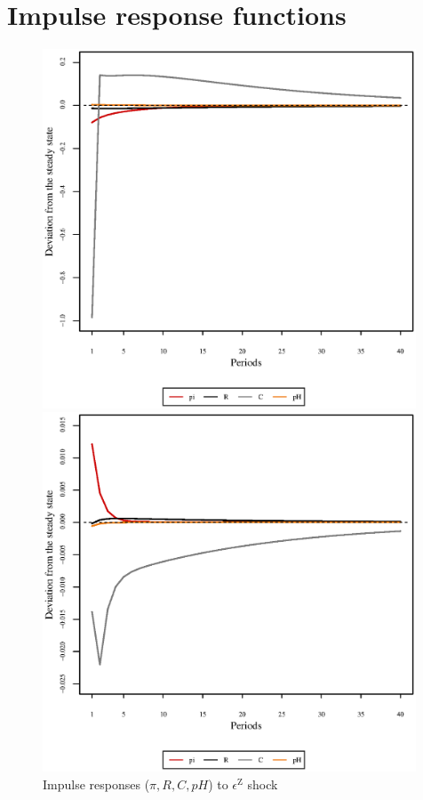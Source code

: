 \pagebreak

\section{Impulse response functions}

\begin{figure}[h]
\begin{minipage}{0.5\textwidth}
\vspace*{-3em}
\centering
\includegraphics[width=0.99\textwidth, scale=0.55]{plots/plot_31.eps}
\caption{Impulse responses ($\pi, R, C, {p\!H}$) to $\epsilon^{\mathrm{Z}}$ shock}
\end{minipage}
\begin{minipage}{0.5\textwidth}
\vspace*{-3em}
\centering
\includegraphics[width=0.99\textwidth, scale=0.55]{plots/plot_32.eps}

\end{minipage}
\end{figure}
